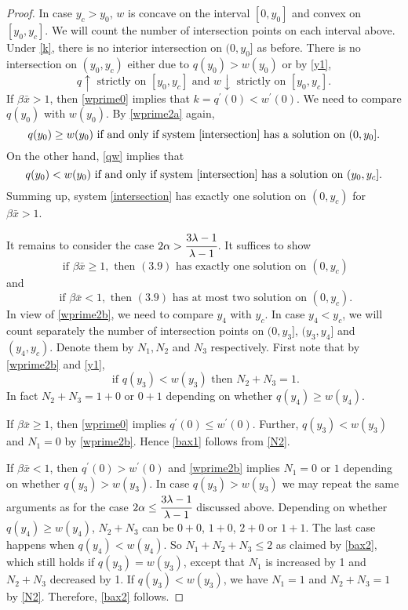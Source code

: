 \documentclass[11pt]{article}
\begin{document}
\begin{proof}
In case $y_c > y_0$,  $w$ is concave on the interval $[0,y_0]$ and convex on $[y_0,y_c]$. We will count the number of intersection points on each interval above.
Under \eqref{k}, there is no interior intersection on
 $(0,y_0]$ as before. There is no  intersection on
 $(y_0,y_c)$ either due to $q(y_0) > w(y_0)$ or by  \eqref{y1},
 \begin{equation}\label{qw}
 q \uparrow  \mbox{ strictly on } [y_0,y_c]  \mbox{ and } w \downarrow \mbox{ strictly  on } [y_0,y_c].
 \end{equation}
 If $ \beta \bar x > 1$, then \eqref{wprime0} implies that $k= q^\prime(0)< w^\prime(0)$. We need to compare $ q(y_0)$ with $ w(y_0)$. By \eqref{wprime2a} again,
 $$
 q(y_0) \geq w(y_0) \mbox{ if and only if  system  \eqref{intersection} has a solution on } (0,y_0].
 $$
On the other hand,   \eqref{qw} implies that
 $$
 q(y_0) < w(y_0) \mbox{ if and only if  system }  \eqref{intersection} \mbox{ has a solution on } (y_0,y_c].
 $$
 Summing up, system  \eqref{intersection} has exactly one solution on $(0,y_c)$ for $ \beta \bar x > 1$.

 It remains to consider the case $ 2\alpha > \cfrac{3\lambda-1}{\lambda-1}$. It suffices  to show
 \begin{equation}\label{bax1}
 \mbox{ if }  \beta \bar x \geq 1,  \mbox{ then } (3.9) \mbox{ has exactly one solution on } (0,y_c)
 \end{equation}
 and
  \begin{equation}\label{bax2}
 \mbox{ if }  \beta \bar x < 1,  \mbox{ then } (3.9) \mbox { has at most two solution on } (0,y_c).
 \end{equation}
 In view of \eqref{wprime2b}, we need to compare $y_4$ with $y_c$. In case  $y_4 < y_c$, we will count separately the number of intersection points
 on $(0,y_3]$, $(y_3,y_4]$ and $(y_4,y_c)$. Denote them by $N_1, N_2$ and $N_3$ respectively. First note that by \eqref{wprime2b} and \eqref{y1},
 \begin{equation}\label{N2}
\mbox{  if } q(y_3) <w(y_3)     \mbox{ then } N_2+N_3 =1.
\end{equation}
In fact  $N_2+N_3 =1+0 $ or $0+1$ depending on whether  $q(y_4)  \geq w(y_4)$.

If $ \beta \bar x \geq 1$, then \eqref{wprime0} implies
$q^\prime(0) \leq w^\prime(0) $. Further,  $q(y_3) <w(y_3)$  and
$N_1=0$ by \eqref{wprime2b}. Hence \eqref{bax1} follows from
\eqref{N2}.

 If $ \beta \bar x < 1$, then $q^\prime(0) > w^\prime(0) $ and \eqref{wprime2b} implies $N_1=0$ or $1$ depending on whether $q(y_3)>w(y_3)$.
 In case $q(y_3) >w(y_3)$ we may repeat the same arguments as for the case $ 2\alpha \leq \cfrac{3\lambda-1}{\lambda-1}$ discussed above.
 Depending on whether $q(y_4) \geq w(y_4)$,  $N_2 +N_3$ can be $0+0$, $1+0$, $2+0$ or $1+1$. The last case happens when $q(y_4) < w(y_4)$.  So $N_1+N_2+N_3 \leq 2$
 as claimed by \eqref{bax2}, which still holds if  $q(y_3) =w(y_3)$, except that  $N_1$ is increased by 1 and $N_2+N_3 $ decreased by 1.
 If $q(y_3) <w(y_3)$, we have $N_1= 1$ and $ N_2+N_3 =1$ by \eqref{N2}. Therefore, \eqref{bax2} follows.


\end{proof}
\end{document}
